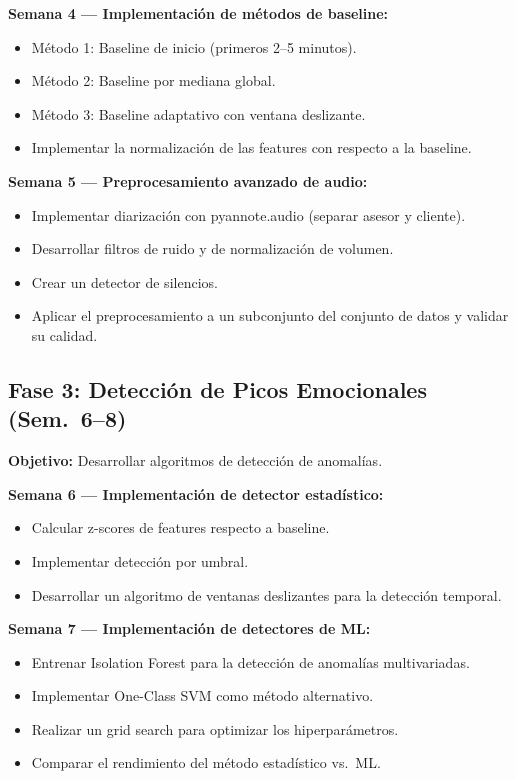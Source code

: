 \textbf{Semana 4 — Implementación de métodos de baseline:}
\begin{itemize}
    \item Método 1: Baseline de inicio (primeros 2--5 minutos).
    \item Método 2: Baseline por mediana global.
    \item Método 3: Baseline adaptativo con ventana deslizante.
    \item Implementar la normalización de las features con respecto a la baseline.
\end{itemize}

\textbf{Semana 5 — Preprocesamiento avanzado de audio:}
\begin{itemize}
    \item Implementar diarización con pyannote.audio (separar asesor y cliente).
    \item Desarrollar filtros de ruido y de normalización de volumen.
    \item Crear un detector de silencios.
    \item Aplicar el preprocesamiento a un subconjunto del conjunto de datos y
          validar su calidad.
\end{itemize}

\subsection{Fase 3: Detección de Picos Emocionales (Sem.\ 6--8)}

\textbf{Objetivo:} Desarrollar algoritmos de detección de anomalías.

\textbf{Semana 6 — Implementación de detector estadístico:}
\begin{itemize}
    \item Calcular z-scores de features respecto a baseline.
    \item Implementar detección por umbral.
    \item Desarrollar un algoritmo de ventanas deslizantes para la detección temporal.
\end{itemize}

\textbf{Semana 7 — Implementación de detectores de ML:}
\begin{itemize}
    \item Entrenar Isolation Forest para la detección de anomalías multivariadas.
    \item Implementar One-Class SVM como método alternativo.
    \item Realizar un grid search para optimizar los hiperparámetros.
    \item Comparar el rendimiento del método estadístico vs.\ ML.
\end{itemize}

